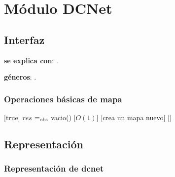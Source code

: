 \section{Módulo DCNet}

\subsection{Interfaz}

\textbf{se explica con}: .

\textbf{géneros}: .

\subsubsection{Operaciones básicas de mapa}

[true]
{$res$ $=_{\mathrm{obs}}$ vacio()}
[$O(1)$]
[crea un mapa nuevo]
[]

\subsection{Representación}

\subsubsection{Representación de dcnet}

